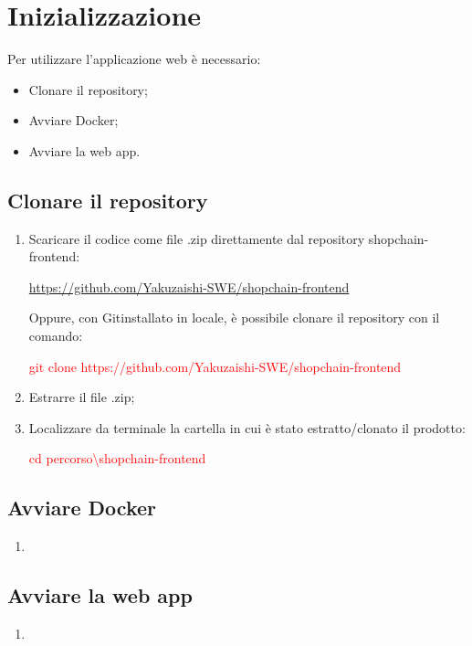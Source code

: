 \section{Inizializzazione}

Per utilizzare l’applicazione web è necessario:
\begin{itemize}
    \item Clonare il repository;
    \item Avviare Docker;
    \item Avviare la web app.
\end{itemize}

\subsection{Clonare il repository}

\begin{enumerate}
    \item Scaricare il codice come file .zip direttamente dal repository shopchain-frontend:
            \begin{center}
                \href{https://github.com/Yakuzaishi-SWE/shopchain-frontend}{https://github.com/Yakuzaishi-SWE/shopchain-frontend}
            \end{center}
            Oppure, con Git\glo installato in locale, è possibile clonare il repository con il comando:
            \begin{center}
                \textcolor{red}{git clone https://github.com/Yakuzaishi-SWE/shopchain-frontend}
            \end{center}
    \item Estrarre il file .zip;
    \item Localizzare da terminale la cartella in cui è stato estratto/clonato il prodotto:
            \begin{center}
                \textcolor{red}{cd percorso\textbackslash shopchain-frontend}
            \end{center}
\end{enumerate}

\subsection{Avviare Docker}

\begin{enumerate}
    \item
\end{enumerate}

\subsection{Avviare la web app}

\begin{enumerate}
    \item
\end{enumerate}